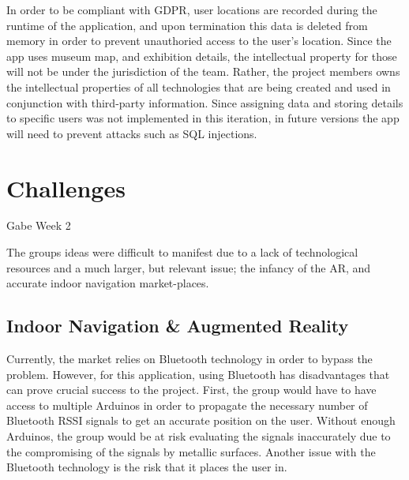 In order to be compliant with GDPR, user locations are recorded during the runtime of the application, and upon termination this data is deleted from memory in order to prevent unauthoried access to the user's location. Since the app uses museum map, and exhibition details, the intellectual property for those will not be under the jurisdiction of the team. Rather, the project members owns the intellectual properties of all technologies that are being created and used in conjunction with third-party information. Since assigning data and storing details to specific users was not implemented in this iteration, in future versions the app will need to prevent attacks such as SQL injections.




\section{Challenges}
Gabe Week 2

The groups ideas were difficult to manifest due to a lack of technological resources and a much larger, but relevant issue; the infancy of the AR, and accurate indoor navigation market-places.

\subsection{Indoor Navigation \& Augmented Reality}
Currently, the market relies on Bluetooth technology in order to bypass the problem. However, for this application, using Bluetooth has disadvantages that can prove crucial success to the project. First, the group would have to have access to multiple Arduinos in order to propagate the necessary number of Bluetooth RSSI signals to get an accurate position on the user. Without enough Arduinos, the group would be at risk evaluating the signals inaccurately due to the compromising of the signals by metallic surfaces. Another issue with the Bluetooth technology is the risk that it places the user in. 

